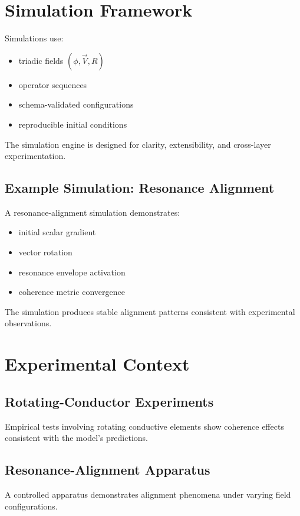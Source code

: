 \documentclass[12pt]{article}
\begin{document}
\section{Simulation Framework}

Simulations use:

\begin{itemize}
    \item triadic fields $(\phi, \vec{V}, R)$
    \item operator sequences
    \item schema-validated configurations
    \item reproducible initial conditions
\end{itemize}

The simulation engine is designed for clarity, extensibility, and cross-layer experimentation.

\subsection{Example Simulation: Resonance Alignment}

A resonance-alignment simulation demonstrates:

\begin{itemize}
    \item initial scalar gradient
    \item vector rotation
    \item resonance envelope activation
    \item coherence metric convergence
\end{itemize}

The simulation produces stable alignment patterns consistent with experimental observations.

\section{Experimental Context}

\subsection{Rotating-Conductor Experiments}
Empirical tests involving rotating conductive elements show coherence effects consistent with the model's predictions.

\subsection{Resonance-Alignment Apparatus}
A controlled apparatus demonstrates alignment phenomena under varying field configurations.
\end{document}
